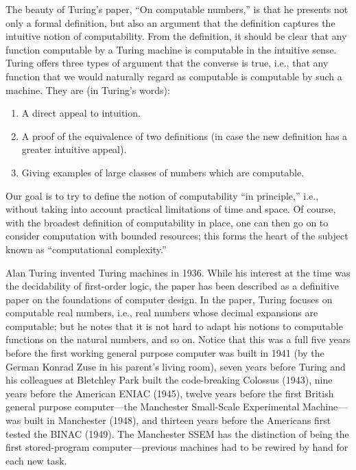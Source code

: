 \documentclass[../../../include/open-logic-section]{subfiles}
\begin{document}
\begin{digress}
The beauty of Turing's paper, ``On computable numbers,'' is that he
presents not only a formal definition, but also an argument that the
definition captures the intuitive notion of computability.
From the definition, it should be clear that any function computable
by a Turing machine is computable in the intuitive sense. Turing
offers three types of argument that the converse is true, i.e., that
any function that we would naturally regard as computable is
computable by such a machine. They are (in Turing's words):
\begin{enumerate}
\item A direct appeal to intuition.
\item A proof of the equivalence of two definitions (in case the new
  definition has a greater intuitive appeal).
\item Giving examples of large classes of numbers which are
  computable.
\end{enumerate}
Our goal is to try to define the notion of computability ``in
principle,'' i.e., without taking into account practical limitations
of time and space. Of course, with the broadest definition of
computability in place, one can then go on to consider computation
with bounded resources; this forms the heart of the subject known as
``computational complexity.''
\end{digress}

\begin{history}
Alan Turing invented Turing machines in 1936. While his interest at
the time was the decidability of first-order logic, the paper has been
described as a definitive paper on the foundations of computer
design. In the paper, Turing focuses on computable real numbers, i.e.,
real numbers whose decimal expansions are computable; but he notes
that it is not hard to adapt his notions to computable functions on
the natural numbers, and so on.  Notice that this was a full five
years before the first working general purpose computer was built in
1941 (by the German Konrad Zuse in his parent's living room), seven
years before Turing and his colleagues at Bletchley Park built the
code-breaking Colossus (1943), nine years before the American ENIAC
(1945), twelve years before the first British general purpose
computer---the Manchester Small-Scale Experimental Machine---was built in
Manchester (1948), and thirteen years before the Americans first
tested the BINAC (1949). The Manchester SSEM has the distinction of
being the first stored-program computer---previous machines had to be
rewired by hand for each new task.
\end{history}
\end{document}
